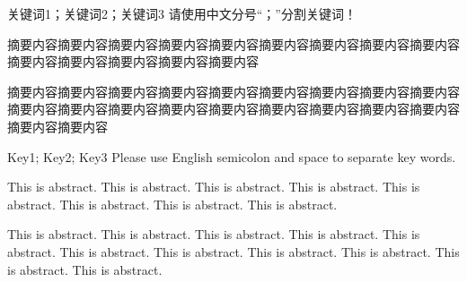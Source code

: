 
\begin{cnabstract}{关键词1；关键词2；关键词3}
  请使用中文分号“；”分割关键词！

  摘要内容摘要内容摘要内容摘要内容摘要内容摘要内容摘要内容摘要内容摘要内容摘要内容摘要内容摘要内容摘要内容摘要内容

  摘要内容摘要内容摘要内容摘要内容摘要内容摘要内容摘要内容摘要内容摘要内容摘要内容摘要内容摘要内容摘要内容摘要内容摘要内容摘要内容摘要内容摘要内容摘要内容摘要内容
\end{cnabstract}


\begin{enabstract}{Key1; Key2; Key3}
  Please use English semicolon and space to separate key words.

  This is abstract. This is abstract. This is abstract. This is abstract. This is abstract. This is abstract. This is abstract. This is abstract.

  This is abstract. This is abstract. This is abstract. This is abstract. This is abstract. This is abstract. This is abstract. This is abstract. This is abstract. This is abstract. This is abstract. 
\end{enabstract}
